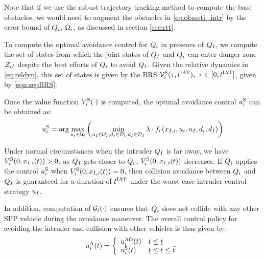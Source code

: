 \begin{remark}
Note that if we use the robust trajectory tracking method to compute the base obstacles, we would need to augment the obstacles in \eqref{eq:obsseti_intr} by the error bound of $Q_i$, $\Omega_i$, as discussed in section \ref{sec:rtt}.
\end{remark}

To compute the optimal avoidance control for $Q_i$ in presence of $Q_{I}$, we compute the set of states from which the joint states of $Q_{I}$ and $Q_i$ can enter danger zone $\mathcal{Z}_{iI}$ despite the best efforts of $Q_i$ to avoid $Q_{I}$. Given the relative dynamics in \eqref{eq:reldyn}, this set of states is given by the BRS $\mathcal{V}^{\text{S}}_{i}(\tau, t^\text{IAT}),~ \tau \in [0, t^\text{IAT}]$, given by \eqref{eqn:sepBRS}.

Once the value function $V^{\text{S}}_{i}(\cdot)$ is computed, the optimal avoidance control ${u^{\text{S}}_{i}}$ can be obtained as:
\begin{equation} \label{eqn:optAvoidCtrl}
{\ctrl^{\text{S}}_{i}} = \arg \max_{\ctrl_i \in \cset_i} \left( \min_{\ctrl_\intr \in \cset_\intr, \dstb_i \in \dset_i, \dstb_\intr \in \dset_\intr} \costate \cdot f_r(\state_{\intr, i}, \ctrl_i, \ctrl_\intr, \dstb_i, \dstb_\intr) \right)
\end{equation}

Under normal circumstances when the intruder $Q_{I}$ is far away, we have $V^{\text{S}}_{i}(0, x_{I, i}(t)) > 0$; as $Q_{I}$ gets closer to $Q_i$, $V^{\text{S}}_{i}(0, x_{I, i}(t))$ decreases. If $Q_i$ applies the control ${u^{\text{S}}_{i}}$ when $V^{\text{S}}_{i}(0, x_{I, i}(t)) = 0$, then collision avoidance between $Q_i$ and $Q_{I}$ is guaranteed for a duration of $t^\text{IAT}$ under the worst-case intruder control strategy $u_I$.

In addition, computation of $\mathcal{G}_i(\cdot)$ ensures that $Q_i$ does not collide with any other SPP vehicle during the avoidance maneuver. %
The overall control policy for avoiding the intruder and collision with other vehicles is thus given by:
\begin{equation*}
{u^{\text{A}}_{i}}(t) = 
\left \{ 
\begin{array}{ll}
{u^{\text{AO}}_{i}}(t) & t \leq \underline{t}\\
{u^{\text{S}}_{i}}(t) & \underline{t}\leq t \leq \bar{t}
\end{array}
\right.
\end{equation*}

